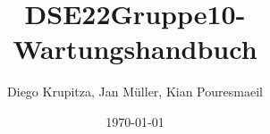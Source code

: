 \usepackage[utf8]{inputenc}
\usepackage[T1]{fontenc}

\usepackage[ngerman]{isodate, babel}
\usepackage[german=quotes]{csquotes}

\usepackage[hyphens]{url}
\usepackage[]{hyperref}
\hypersetup{colorlinks, citecolor=black, linkcolor=black, urlcolor=black}

\usepackage{titling}
\title{DSE22Gruppe10-Wartungshandbuch}
\author{Diego Krupitza, Jan Müller, Kian Pouresmaeil}
\date{\today}

\usepackage{fancyhdr}
\pagestyle{fancy}
\fancyhead{} %
\renewcommand{\headrulewidth}{0pt} %
\fancyfoot{} %
\fancyfoot[LE,RO]{\thepage} %
\fancyfoot[RE,LO]{\thetitle}
